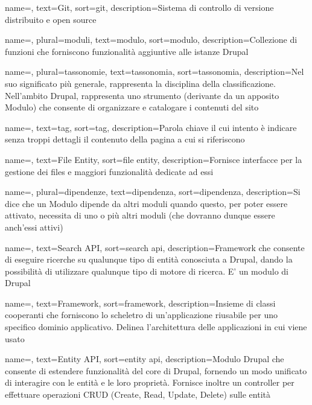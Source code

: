 {
	name=,
	text=Git,
	sort=git,
	description={Sistema di controllo di versione distribuito e open source}
}

{
	name=,
	plural=moduli,
	text=modulo,
	sort=modulo,
	description={Collezione di funzioni che forniscono funzionalità aggiuntive alle istanze \gls{Drupal} }
}

{
	name=,
	plural=tassonomie,
	text=tassonomia,
	sort=tassonomia,
	description={Nel suo significato più generale, rappresenta la disciplina della classificazione. Nell'ambito \gls{Drupal}, rappresenta uno strumento (derivante da un apposito \gls{Modulo}) che consente di organizzare e catalogare i contenuti del sito}
}

{
	name=,
	text=tag,
	sort=tag,
	description={Parola chiave il cui intento è indicare senza troppi dettagli il contenuto della pagina a cui si riferiscono}
}

{
	name=,
	text=File Entity,
	sort=file entity,
	description={Fornisce interfacce per la gestione dei files e maggiori funzionalità dedicate ad essi}	
}

{
	name=,
	plural=dipendenze,
	text=dipendenza,
	sort=dipendenza,
	description={Si dice che un \gls{Modulo} dipende da altri moduli quando questo, per poter essere attivato, necessita di uno o più altri moduli (che dovranno dunque essere anch'essi attivi)}
}

{
	name=,
	text=Search API,
	sort=search api,
	description={\gls{Framework} che consente di eseguire ricerche su qualunque tipo di entità conosciuta a \gls{Drupal}, dando la possibilità di utilizzare qualunque tipo di motore di ricerca. E' un modulo di \gls{Drupal}}
}

{
	name=,
	text=Framework,
	sort=framework,
	description={Insieme di classi cooperanti che forniscono lo scheletro di un’applicazione riusabile per uno specifico dominio applicativo. Delinea l’architettura delle applicazioni in cui viene usato}
}

{
	name=,
	text=Entity API,
	sort=entity api,
	description={\gls{Modulo} \gls{Drupal} che consente di estendere funzionalità del core di \gls{Drupal}, fornendo un modo unificato di interagire con le entità e le loro proprietà. Fornisce inoltre un controller per effettuare operazioni CRUD (Create, Read, Update, Delete) sulle entità}
}

